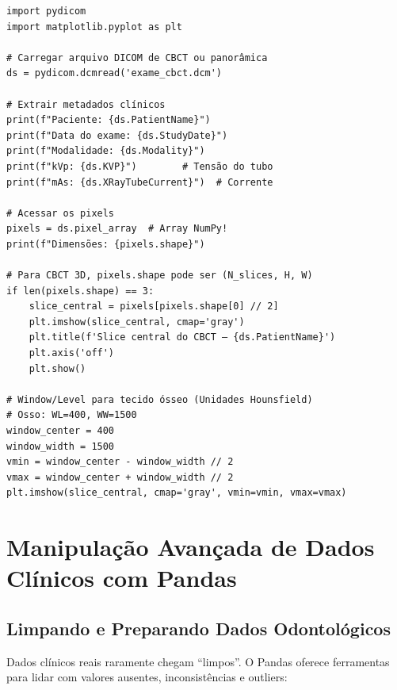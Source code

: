 \begin{verbatim}
import pydicom
import matplotlib.pyplot as plt

# Carregar arquivo DICOM de CBCT ou panorâmica
ds = pydicom.dcmread('exame_cbct.dcm')

# Extrair metadados clínicos
print(f"Paciente: {ds.PatientName}")
print(f"Data do exame: {ds.StudyDate}")
print(f"Modalidade: {ds.Modality}")
print(f"kVp: {ds.KVP}")        # Tensão do tubo
print(f"mAs: {ds.XRayTubeCurrent}")  # Corrente

# Acessar os pixels
pixels = ds.pixel_array  # Array NumPy!
print(f"Dimensões: {pixels.shape}")

# Para CBCT 3D, pixels.shape pode ser (N_slices, H, W)
if len(pixels.shape) == 3:
    slice_central = pixels[pixels.shape[0] // 2]
    plt.imshow(slice_central, cmap='gray')
    plt.title(f'Slice central do CBCT — {ds.PatientName}')
    plt.axis('off')
    plt.show()

# Window/Level para tecido ósseo (Unidades Hounsfield)
# Osso: WL=400, WW=1500
window_center = 400
window_width = 1500
vmin = window_center - window_width // 2
vmax = window_center + window_width // 2
plt.imshow(slice_central, cmap='gray', vmin=vmin, vmax=vmax)
\end{verbatim}

\section{Manipulação Avançada de Dados Clínicos com Pandas}

\subsection{Limpando e Preparando Dados Odontológicos}

Dados clínicos reais raramente chegam ``limpos''. O Pandas oferece ferramentas para lidar com valores ausentes, inconsistências e outliers:

